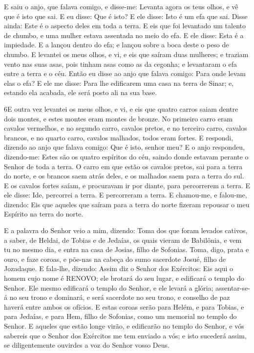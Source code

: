 E saiu o anjo, que falava comigo, e disse-me: Levanta agora os
teus olhos, e vê que é isto que sai. E eu disse: Que é isto? E
ele disse: Isto é um efa que sai. Disse ainda: Este é o aspecto
deles em toda a terra. E eis que foi levantado um talento de
chumbo, e uma mulher estava assentada no meio do efa. E ele
disse: Esta é a impiedade. E a lançou dentro do efa; e lançou sobre
a boca deste o peso de chumbo. E levantei os meus olhos, e vi, e
eis que saíram duas mulheres; e traziam vento nas suas asas, pois
tinham asas como as da cegonha; e levantaram o efa entre a terra e o
céu. Então eu disse ao anjo que falava comigo: Para onde
levam elas o efa? E ele me disse: Para lhe edificarem uma
casa na terra de Sinar; e, estando ela acabada, ele será posto ali
na sua base.

\medskip

\lettrine{6} E outra vez levantei os meus olhos, e vi, e eis
que quatro carros saiam dentre dois montes, e estes montes eram
montes de bronze. No primeiro carro eram cavalos vermelhos, e no
segundo carro, cavalos pretos, e no terceiro carro, cavalos
brancos, e no quarto carro, cavalos malhados, todos eram fortes.
E respondi, dizendo ao anjo que falava comigo: Que é isto,
senhor meu? E o anjo respondeu, dizendo-me: Estes são os quatro
espíritos do céu, saindo donde estavam perante o Senhor de toda a
terra. O carro em que estão os cavalos pretos, sai para a terra
do norte, e os brancos saem atrás deles, e os malhados saem para a
terra do sul. E os cavalos fortes saíam, e procuravam ir por
diante, para percorrerem a terra. E ele disse: Ide, percorrei a
terra. E percorreram a terra. E chamou-me, e falou-me, dizendo:
Eis que aqueles que saíram para a terra do norte fizeram repousar o
meu Espírito na terra do norte.

E a palavra do Senhor veio a mim, dizendo: Toma dos que
foram levados cativos, a saber, de Heldai, de Tobias e de Jedaías,
os quais vieram de Babilônia, e vem tu no mesmo dia, e entra na casa
de Josias, filho de Sofonias. Toma, digo, prata e ouro, e
faze coroas, e põe-nas na cabeça do sumo sacerdote Josué, filho de
Jozadaque. E fala-lhe, dizendo: Assim diz o Senhor dos
Exércitos: Eis aqui o homem cujo nome é RENOVO; ele brotará do seu
lugar, e edificará o templo do Senhor. Ele mesmo edificará o
templo do Senhor, e ele levará a glória; assentar-se-á no seu trono
e dominará, e será sacerdote no seu trono, e conselho de paz haverá
entre ambos os ofícios. E estas coroas serão para Helém, e
para Tobias, e para Jedaías, e para Hem, filho de Sofonias, como um
memorial no templo do Senhor. E aqueles que estão longe
virão, e edificarão no templo do Senhor, e vós sabereis que o Senhor
dos Exércitos me tem enviado a vós; e isto sucederá assim, se
diligentemente ouvirdes a voz do Senhor vosso Deus.

